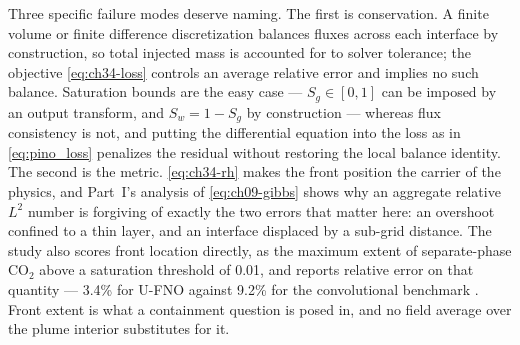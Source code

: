 Three specific failure modes deserve naming. The first is conservation. A finite
volume or finite difference discretization balances fluxes across each interface by
construction, so total injected mass is accounted for to solver tolerance; the
objective \eqref{eq:ch34-loss} controls an average relative error and implies no
such balance. Saturation bounds are the easy case --- $S_g \in [0,1]$ can be
imposed by an output transform, and $S_w = 1 - S_g$ by construction --- whereas
flux consistency is not, and putting the differential equation into the loss as in
\eqref{eq:pino_loss} penalizes the residual without restoring the local balance
identity. The second is the metric. \eqref{eq:ch34-rh} makes the front position the
carrier of the physics, and Part~I's analysis of \eqref{eq:ch09-gibbs} shows why an
aggregate relative $L^2$ number is forgiving of exactly the two errors that matter
here: an overshoot confined to a thin layer, and an interface displaced by a sub-grid
distance. The study also scores front location directly, as the maximum extent of
separate-phase $\mathrm{CO}_2$ above a saturation threshold of 0.01, and reports
relative error on that quantity --- 3.4\% for U-FNO against 9.2\% for the
convolutional benchmark \cite{wen2022ufno}. Front extent is what a
containment question is posed in, and no field average over the plume interior
substitutes for it.

